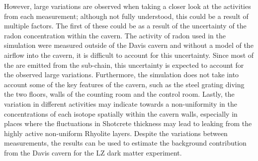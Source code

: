 

However, large variations are observed when taking a closer look at the activities from each measurement; although not fully understood, this could be a result of multiple factors. The first of these could be as a result of the uncertainty of the radon concentration within the cavern. The activity of radon used in the simulation were measured outside of the Davis cavern and without a model of the airflow into the cavern, it is difficult to account for this uncertainty. Since most of the \grays{} are emitted from the \RnTTT{} sub-chain, this uncertainty is expected to account for the observed large variations. Furthermore, the simulation does not take into account some of the key features of the cavern, such as the steel grating diving the two floors, walls of the counting room and the control room. Lastly, the variation in different activities may indicate towards a non-uniformity in the concentrations of each isotope spatially within the cavern walls, especially in places where the fluctuations in Shotcrete thickness may lead to \grays{} leaking from the highly active non-uniform Rhyolite layers. Despite the variations between measurements, the results can be used to estimate the background contribution from the Davis cavern for the LZ dark matter experiment.

